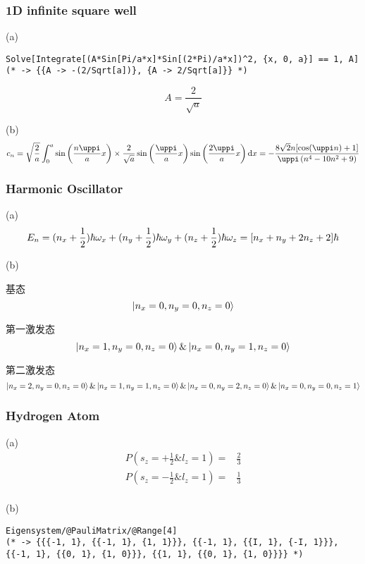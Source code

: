 \subsubsection{1D infinite square well}

(a)
\begin{verbatim}
Solve[Integrate[(A*Sin[Pi/a*x]*Sin[(2*Pi)/a*x])^2, {x, 0, a}] == 1, A]
(* -> {{A -> -(2/Sqrt[a])}, {A -> 2/Sqrt[a]}} *)
\end{verbatim}
\[
A = \frac{2}{\sqrt{a}}
\]

(b)
\[
c_n = \sqrt{\frac{2}{a}} \int_0^a \sin \qty(\frac{n \uppi}{a} x) \times \frac{2}{\sqrt{a}} \sin \qty(\frac{\uppi}{a} x) \sin \qty(\frac{2 \uppi}{a} x) \dd{x} = -\frac{8 \sqrt{2} n [\cos (\uppi  n)+1]}{\uppi  \left(n^4-10 n^2+9\right)}
\]

\subsubsection{Harmonic Oscillator}

(a)
\[
E_n = (n_x + \frac{1}{2}) \hbar \omega_x + (n_y + \frac{1}{2}) \hbar \omega_y + (n_z + \frac{1}{2}) \hbar \omega_z = \qty[n_x + n_y + 2 n_z + 2] \hbar
\]

(b)

基态 \[
\ket{n_x = 0, n_y = 0, n_z = 0}
\]

第一激发态 \[
\ket{n_x = 1, n_y = 0, n_z = 0} \& \ket{n_x = 0, n_y = 1, n_z = 0}
\]

第二激发态 \[
\ket{n_x = 2, n_y = 0, n_z = 0} \& \ket{n_x = 1, n_y = 1, n_z = 0} \& \ket{n_x = 0, n_y = 2, n_z = 0} \& \ket{n_x = 0, n_y = 0, n_z = 1}
\]

\subsubsection{Hydrogen Atom}

(a)
\begin{align*}
    P(s_z = + \frac{1}{2} \& l_z = 1) = & \frac{2}{3}\\
    P(s_z = - \frac{1}{2} \& l_z = 1) = & \frac{1}{3}\\
\end{align*}

(b)

\begin{verbatim}
Eigensystem/@PauliMatrix/@Range[4]
(* -> {{{-1, 1}, {{-1, 1}, {1, 1}}}, {{-1, 1}, {{I, 1}, {-I, 1}}}, {{-1, 1}, {{0, 1}, {1, 0}}}, {{1, 1}, {{0, 1}, {1, 0}}}} *)
\end{verbatim}

